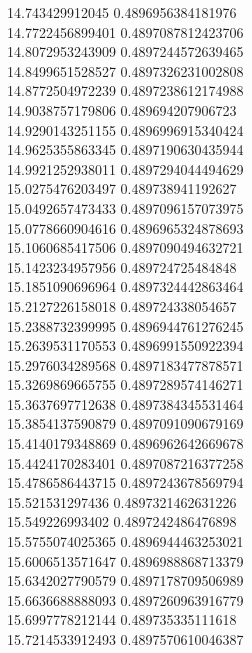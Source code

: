 {14.743429912045 0.4896956384181976
 \\
14.7722456899401 0.4897087812423706
 \\
14.8072953243909 0.4897244572639465
 \\
14.8499651528527 0.4897326231002808
 \\
14.8772504972239 0.4897238612174988
 \\
14.9038757179806 0.489694207906723
 \\
14.9290143251155 0.4896996915340424
 \\
14.9625355863345 0.4897190630435944
 \\
14.9921252938011 0.4897294044494629
 \\
15.0275476203497 0.489738941192627
 \\
15.0492657473433 0.4897096157073975
 \\
15.0778660904616 0.4896965324878693
 \\
15.1060685417506 0.4897090494632721
 \\
15.1423234957956 0.489724725484848
 \\
15.1851090696964 0.4897324442863464
 \\
15.2127226158018 0.489724338054657
 \\
15.2388732399995 0.4896944761276245
 \\
15.2639531170553 0.4896991550922394
 \\
15.2976034289568 0.4897183477878571
 \\
15.3269869665755 0.4897289574146271
 \\
15.3637697712638 0.4897384345531464
 \\
15.3854137590879 0.4897091090679169
 \\
15.4140179348869 0.4896962642669678
 \\
15.4424170283401 0.4897087216377258
 \\
15.4786586443715 0.4897243678569794
 \\
15.521531297436 0.4897321462631226
 \\
15.549226993402 0.4897242486476898
 \\
15.5755074025365 0.4896944463253021
 \\
15.6006513571647 0.4896988868713379
 \\
15.6342027790579 0.4897178709506989
 \\
15.6636688888093 0.4897260963916779
 \\
15.6997778212144 0.489735335111618
 \\
15.7214533912493 0.4897570610046387
 \\
}

